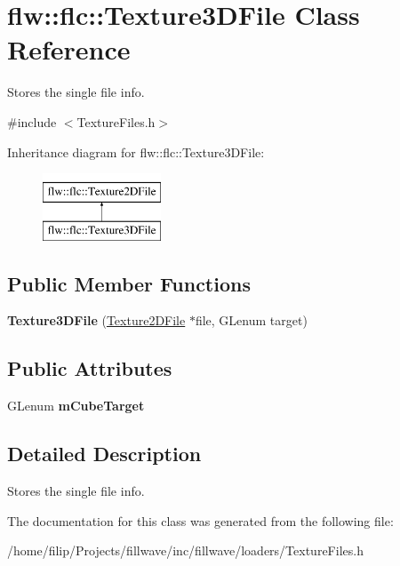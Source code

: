 \hypertarget{classflw_1_1flc_1_1Texture3DFile}{}\section{flw\+:\+:flc\+:\+:Texture3\+D\+File Class Reference}
\label{classflw_1_1flc_1_1Texture3DFile}


Stores the single file info.  




{\ttfamily \#include $<$Texture\+Files.\+h$>$}

Inheritance diagram for flw\+:\+:flc\+:\+:Texture3\+D\+File\+:\begin{figure}[H]
\begin{center}
\leavevmode
\includegraphics[height=2.000000cm]{classflw_1_1flc_1_1Texture3DFile}
\end{center}
\end{figure}
\subsection*{Public Member Functions}
\begin{DoxyCompactItemize}
\item 
{\bfseries Texture3\+D\+File} (\hyperlink{classflw_1_1flc_1_1Texture2DFile}{Texture2\+D\+File} $\ast$file, G\+Lenum target)\hypertarget{classflw_1_1flc_1_1Texture3DFile_a15af8ed7c04a59c6e1ff109dd695617c}{}\label{classflw_1_1flc_1_1Texture3DFile_a15af8ed7c04a59c6e1ff109dd695617c}

\end{DoxyCompactItemize}
\subsection*{Public Attributes}
\begin{DoxyCompactItemize}
\item 
G\+Lenum {\bfseries m\+Cube\+Target}\hypertarget{classflw_1_1flc_1_1Texture3DFile_af90bf6759f1b4ca1969014f866eecf7a}{}\label{classflw_1_1flc_1_1Texture3DFile_af90bf6759f1b4ca1969014f866eecf7a}

\end{DoxyCompactItemize}


\subsection{Detailed Description}
Stores the single file info. 

The documentation for this class was generated from the following file\+:\begin{DoxyCompactItemize}
\item 
/home/filip/\+Projects/fillwave/inc/fillwave/loaders/Texture\+Files.\+h\end{DoxyCompactItemize}
